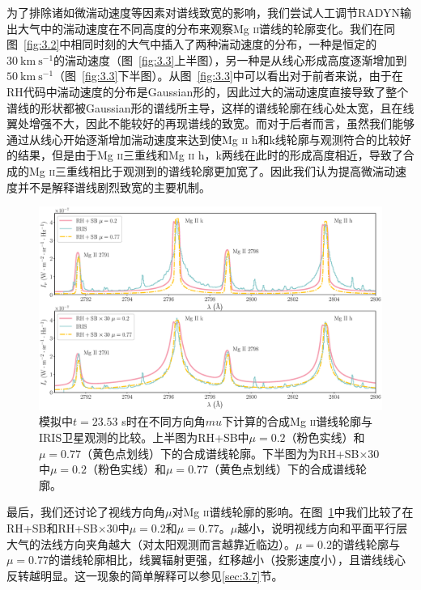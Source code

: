 为了排除诸如微湍动速度等因素对谱线致宽的影响，我们尝试人工调节RADYN输出大气中的湍动速度在不同高度的分布来观察Mg \textsc{ii}谱线的轮廓变化。我们在同图~\ref{fig:3.2}中相同时刻的大气中插入了两种湍动速度的分布，一种是恒定的$30\ \mathrm{km \  s^{-1}}$的湍动速度（图~\ref{fig:3.3}上半图），另一种是从线心形成高度逐渐增加到$50\ \mathrm{km \  s^{-1}}$（图~\ref{fig:3.3}下半图）。从图~\ref{fig:3.3}中可以看出对于前者来说，由于在RH代码中湍动速度的分布是Gaussian形的，因此过大的湍动速度直接导致了整个谱线的形状都被Gaussian形的谱线所主导，这样的谱线轮廓在线心处太宽，且在线翼处增强不大，因此不能较好的再现谱线的致宽。而对于后者而言，虽然我们能够通过从线心开始逐渐增加湍动速度来达到使Mg \textsc{ii} h和k线轮廓与观测符合的比较好的结果，但是由于Mg \textsc{ii}三重线和Mg \textsc{ii} h，k两线在此时的形成高度相近，导致了合成的Mg \textsc{ii}三重线相比于观测到的谱线轮廓更加宽了。因此我们认为提高微湍动速度并不是解释谱线剧烈致宽的主要机制。

\begin{figure}
	\centering
	\includegraphics[width=\textwidth]{figs/MgII_mu02}
	\caption{模拟中$t=23.53$ s时在不同方向角$mu$下计算的合成Mg \textsc{ii}谱线轮廓与IRIS卫星观测的比较。上半图为RH+SB中$\mu=0.2$（粉色实线）和$\mu = 0.77$（黄色点划线）下的合成谱线轮廓。下半图为为RH+SB$\times$30中$\mu=0.2$（粉色实线）和$\mu = 0.77$（黄色点划线）下的合成谱线轮廓。}
	\label{fig:3.3.5}
\end{figure}

最后，我们还讨论了视线方向角$\mu$对Mg \textsc{ii}谱线轮廓的影响。在图~\ref{fig:3.3.5}中我们比较了在RH+SB和RH+SB$\times$30中$\mu=0.2$和$\mu=0.77$。$\mu$越小，说明视线方向和平面平行层大气的法线方向夹角越大（对太阳观测而言越靠近临边）。$\mu = 0.2$的谱线轮廓与$\mu = 0.77$的谱线轮廓相比，线翼辐射更强，红移越小（投影速度小），且谱线线心反转越明显。这一现象的简单解释可以参见\ref{sec:3.7}节。

